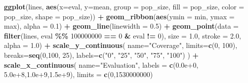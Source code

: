 \documentclass[
]{book}
\newenvironment{Shaded}{\begin{snugshade}}{\end{snugshade}}
\newcommand{\AttributeTok}[1]{\textcolor[rgb]{0.13,0.29,0.53}{#1}}
\newcommand{\DecValTok}[1]{\textcolor[rgb]{0.00,0.00,0.81}{#1}}
\newcommand{\FloatTok}[1]{\textcolor[rgb]{0.00,0.00,0.81}{#1}}
\newcommand{\FunctionTok}[1]{\textcolor[rgb]{0.13,0.29,0.53}{\textbf{#1}}}
\newcommand{\NormalTok}[1]{#1}
\newcommand{\SpecialCharTok}[1]{\textcolor[rgb]{0.81,0.36,0.00}{\textbf{#1}}}
\newcommand{\StringTok}[1]{\textcolor[rgb]{0.31,0.60,0.02}{#1}}
\begin{document}
\begin{Shaded}
\begin{Highlighting}[]
\FunctionTok{ggplot}\NormalTok{(lines, }\FunctionTok{aes}\NormalTok{(}\AttributeTok{x=}\NormalTok{eval, }\AttributeTok{y=}\NormalTok{mean, }\AttributeTok{group =}\NormalTok{ pop\_size, }\AttributeTok{fill =}\NormalTok{ pop\_size, }\AttributeTok{color =}\NormalTok{ pop\_size, }\AttributeTok{shape =}\NormalTok{ pop\_size)) }\SpecialCharTok{+}
  \FunctionTok{geom\_ribbon}\NormalTok{(}\FunctionTok{aes}\NormalTok{(}\AttributeTok{ymin =}\NormalTok{ min, }\AttributeTok{ymax =}\NormalTok{ max), }\AttributeTok{alpha =} \FloatTok{0.1}\NormalTok{) }\SpecialCharTok{+}
  \FunctionTok{geom\_line}\NormalTok{(}\AttributeTok{linewidth =} \FloatTok{0.5}\NormalTok{) }\SpecialCharTok{+}
  \FunctionTok{geom\_point}\NormalTok{(}\AttributeTok{data =} \FunctionTok{filter}\NormalTok{(lines, eval }\SpecialCharTok{\%\%} \DecValTok{100000000} \SpecialCharTok{==} \DecValTok{0} \SpecialCharTok{\&}\NormalTok{ eval }\SpecialCharTok{!=} \DecValTok{0}\NormalTok{), }\AttributeTok{size =} \FloatTok{1.0}\NormalTok{, }\AttributeTok{stroke =} \FloatTok{2.0}\NormalTok{, }\AttributeTok{alpha =} \FloatTok{1.0}\NormalTok{) }\SpecialCharTok{+}
  \FunctionTok{scale\_y\_continuous}\NormalTok{(}
    \AttributeTok{name=}\StringTok{"Coverage"}\NormalTok{,}
    \AttributeTok{limits=}\FunctionTok{c}\NormalTok{(}\DecValTok{0}\NormalTok{, }\DecValTok{100}\NormalTok{),}
    \AttributeTok{breaks=}\FunctionTok{seq}\NormalTok{(}\DecValTok{0}\NormalTok{,}\DecValTok{100}\NormalTok{, }\DecValTok{25}\NormalTok{),}
    \AttributeTok{labels=}\FunctionTok{c}\NormalTok{(}\StringTok{"0"}\NormalTok{, }\StringTok{"25"}\NormalTok{, }\StringTok{"50"}\NormalTok{, }\StringTok{"75"}\NormalTok{, }\StringTok{"100"}\NormalTok{)}
\NormalTok{  ) }\SpecialCharTok{+}
  \FunctionTok{scale\_x\_continuous}\NormalTok{(}
    \AttributeTok{name=}\StringTok{"Evaluation"}\NormalTok{,}
    \AttributeTok{labels =} \FunctionTok{c}\NormalTok{(}\StringTok{\textquotesingle{}0.0e+0\textquotesingle{}}\NormalTok{, }\StringTok{\textquotesingle{}5.0e+8\textquotesingle{}}\NormalTok{,}\StringTok{\textquotesingle{}1.0e+9\textquotesingle{}}\NormalTok{,}\StringTok{\textquotesingle{}1.5e+9\textquotesingle{}}\NormalTok{),}
    \AttributeTok{limits =} \FunctionTok{c}\NormalTok{(}\DecValTok{0}\NormalTok{,}\DecValTok{1530000000}\NormalTok{)}


\end{Highlighting}
\end{Shaded}
\end{document}
